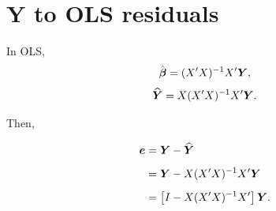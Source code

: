 \section{$\boldsymbol{Y}$ to OLS residuals}
\label{app:Y_to_residuals}

In OLS, 
$$\hat{\boldsymbol{\beta}} = (X'X)^{-1}X'\boldsymbol{Y},$$
\vspace{0.2cm}
$$\widehat{\boldsymbol{Y}} = X(X'X)^{-1}X'\boldsymbol{Y}.$$

Then,

\begin{align*}
\boldsymbol{e} &= \boldsymbol{Y} - \widehat{\boldsymbol{Y}} \\[0.5em]
&= \boldsymbol{Y} - X(X'X)^{-1}X'\boldsymbol{Y} \\[0.5em]
&= \left[ I - X(X'X)^{-1}X' \right] \boldsymbol{Y}.
\end{align*}